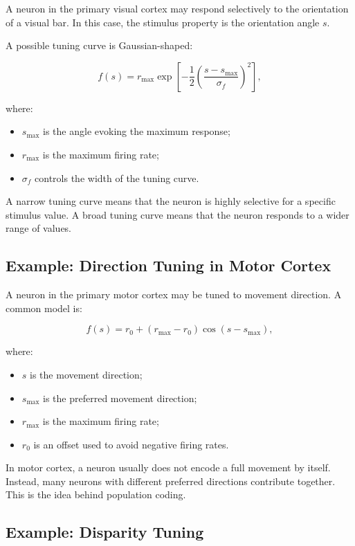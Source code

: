 A neuron in the primary visual cortex may respond selectively to the orientation of a visual bar. In this case, the stimulus property is the orientation angle $s$.

A possible tuning curve is Gaussian-shaped:

\[
f(s)
=
r_{\max}
\exp
\left[
-\frac{1}{2}
\left(
\frac{s - s_{\max}}{\sigma_f}
\right)^2
\right],
\]

where:

\begin{itemize}[noitemsep]
    \item $s_{\max}$ is the angle evoking the maximum response;
    \item $r_{\max}$ is the maximum firing rate;
    \item $\sigma_f$ controls the width of the tuning curve.
\end{itemize}

A narrow tuning curve means that the neuron is highly selective for a specific stimulus value. A broad tuning curve means that the neuron responds to a wider range of values.

\subsection{Example: Direction Tuning in Motor Cortex}

A neuron in the primary motor cortex may be tuned to movement direction. A common model is:

\[
f(s)
=
r_0
+
(r_{\max} - r_0)
\cos(s - s_{\max}),
\]

where:

\begin{itemize}[noitemsep]
    \item $s$ is the movement direction;
    \item $s_{\max}$ is the preferred movement direction;
    \item $r_{\max}$ is the maximum firing rate;
    \item $r_0$ is an offset used to avoid negative firing rates.
\end{itemize}

\begin{authornote}
In motor cortex, a neuron usually does not encode a full movement by itself. Instead, many neurons with different preferred directions contribute together. This is the idea behind population coding.
\end{authornote}

\subsection{Example: Disparity Tuning}

